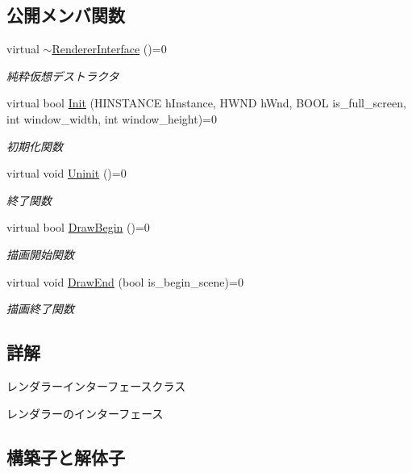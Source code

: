 \subsection*{公開メンバ関数}
\begin{DoxyCompactItemize}
\item 
virtual \mbox{\hyperlink{class_renderer_interface_a571638543a7544e023dc186f7dfc7523}{$\sim$\+Renderer\+Interface}} ()=0
\begin{DoxyCompactList}\small\item\em 純粋仮想デストラクタ \end{DoxyCompactList}\item 
virtual bool \mbox{\hyperlink{class_renderer_interface_aabef76c27c2332c1af2dbcf7e8de5d38}{Init}} (H\+I\+N\+S\+T\+A\+N\+CE h\+Instance, H\+W\+ND h\+Wnd, B\+O\+OL is\+\_\+full\+\_\+screen, int window\+\_\+width, int window\+\_\+height)=0
\begin{DoxyCompactList}\small\item\em 初期化関数 \end{DoxyCompactList}\item 
virtual void \mbox{\hyperlink{class_renderer_interface_ada105489f9db98e7e9542b278699d558}{Uninit}} ()=0
\begin{DoxyCompactList}\small\item\em 終了関数 \end{DoxyCompactList}\item 
virtual bool \mbox{\hyperlink{class_renderer_interface_a86a487deb4e4207a67410d00ec670fd7}{Draw\+Begin}} ()=0
\begin{DoxyCompactList}\small\item\em 描画開始関数 \end{DoxyCompactList}\item 
virtual void \mbox{\hyperlink{class_renderer_interface_a0034a44420e4746062e70e4d66d3bee2}{Draw\+End}} (bool is\+\_\+begin\+\_\+scene)=0
\begin{DoxyCompactList}\small\item\em 描画終了関数 \end{DoxyCompactList}\end{DoxyCompactItemize}


\subsection{詳解}
レンダラーインターフェースクラス 

レンダラーのインターフェース 

\subsection{構築子と解体子}
\mbox{\label{class_renderer_interface_a571638543a7544e023dc186f7dfc7523}} 

